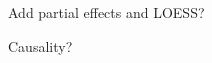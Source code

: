 \documentclass[12pt]{article}
\newcommand{\todo}[1]{{\bf\em TODO:} {{\color{red}{#1}}}}
\newcommand{\spd}{\fontfamily{cmr}\textsc{\small StratPD}}
\begin{document}
{\color{red} Add partial effects and LOESS?}

{\color{red} Causality?}






%
%
%
%
%
 
\end{document}

